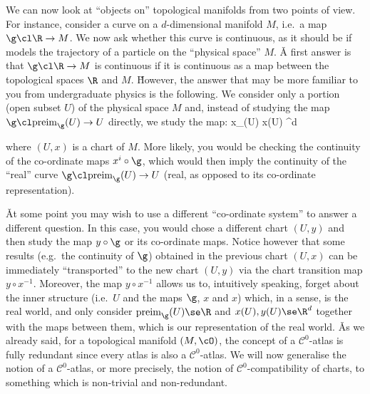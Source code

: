 We can now look at ``objects on'' topological manifolds from two points of view. For instance, consider a curve on a
$d$-dimensional manifold $M$, i.e.\ a map $\g\cl \R\to M$. We now ask whether this curve is continuous, as it should
be if models the trajectory of a particle on the ``physical space'' $M$. \v

A first answer is that $\g\cl \R \to M$ is continuous if it is continuous as a map between the topological spaces
$\R$ and $M$. \v

However, the answer that may be more familiar to you from undergraduate physics is the following. We consider only a
portion (open subset $U$) of the physical space $M$ and, instead of studying the map $\g\cl\mathrm{preim}_\g(U)\to U$
directly, we study the map:
\bse
x\circ \g\cl {}_\g(U) \to x(U) \se \R^d
\ese

where $(U,x)$ is a chart of $M$. More likely, you would be checking the continuity of the co-ordinate maps $x^i\circ
\g$, which would then imply the continuity of the ``real'' curve $\g\cl\mathrm{preim}_\g(U)\to U$ (real, as opposed
to its co-ordinate representation).

\bse
{}
\ese

\v

At some point you may wish to use a different ``co-ordinate system'' to answer a different question. In this case,
you would chose a different chart $(U,y)$ and then study the map $y\circ \g$ or its co-ordinate maps. Notice however
that some results (e.g.\ the continuity of $\g$) obtained in the previous chart $(U,x)$ can be immediately
``transported'' to the new chart $(U,y)$ via the chart transition map $y\circ x^{-1}$. Moreover, the map $y\circ
x^{-1}$ allows us to, intuitively speaking, forget about the inner structure (i.e.\ $U$ and the maps $\g$, $x$ and
$x$) which, in a sense, is the real world, and only consider $\mathrm{preim}_\g(U)\se \R$ and $x(U),y(U)\se\R^d$
together with the maps between them, which is our representation of the real world. \v

As we already said, for a topological manifold $(M,\cO)$, the concept of a $\mathcal{C}^0$-atlas is fully redundant
since every atlas is also a $\mathcal{C}^0$-atlas. We will now generalise the notion of a $\mathcal{C}^0$-atlas, or
more precisely, the notion of $\mathcal{C}^0$-compatibility of charts, to something which is non-trivial and
non-redundant.

